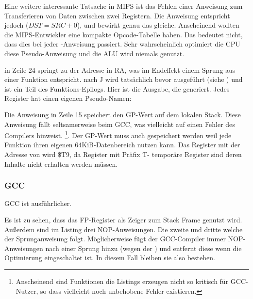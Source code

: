 Eine weitere interessante Tatsache in MIPS ist das Fehlen einer Anweisung zum Transferieren
von Daten zwischen zwei Registern.
Die Anweisung  entspricht jedoch  ($DST=SRC+0$),
und bewirkt genau das gleiche.
Anscheinend wollten die MIPS-Entwickler eine kompakte Opcode-Tabelle haben.
Das bedeutet nicht, dass dies bei jeder -Anweisung passiert.
Sehr wahrscheinlich optimiert die \ac{CPU} diese Pseudo-Anweisung und die \ac{ALU}
wird niemals genutzt.


 in Zeile 24 springt zu der Adresse in \ac{RA}, was im Endeffekt einem Sprung aus einer Funktion entspricht.
 nach J wird tatsächlich bevor  ausgeführt (siehe ) und ist
ein Teil des Funktions-Epilogs.
Hier ist die Ausgabe, die \IDA generiert. Jedes Register hat einen eigenen Pseudo-Namen:



Die Anweisung in Zeile 15 speichert den GP-Wert auf dem lokalen Stack. Diese Anweisung fällt seltsamerweise
beim GCC, was vielleicht auf einen Fehler des Compilers hinweist. \footnote{Anscheinend sind Funktionen die
Listings erzeugen nicht so kritisch für GCC-Nutzer, so dass vielleicht noch unbehobene Fehler existieren.}.
Der GP-Wert muss auch gespeichert werden weil jede Funktion ihren eigenen 64KiB-Datenbereich nutzen kann.
Das Register mit der Adresse von \puts wird \$T9, da Register mit Präfix T- temporäre Register sind deren
Inhalte nicht erhalten werden müssen.

\subsubsection{\NonOptimizing GCC}

\NonOptimizing GCC ist ausführlicher.



Es ist zu sehen, dass das FP-Register als Zeiger zum Stack Frame genutzt wird.
Außerdem sind im Listing drei \ac{NOP}-Anweisungen.
Die zweite und dritte welche der Sprunganweisung folgt.
Möglicherweise fügt der GCC-Compiler immer \ac{NOP}-Anweisungen nach einer Sprung hinzu
(wegen der ) und entfernt diese wenn die Optimierung eingeschaltet ist.
In diesem Fall bleiben sie also bestehen.

